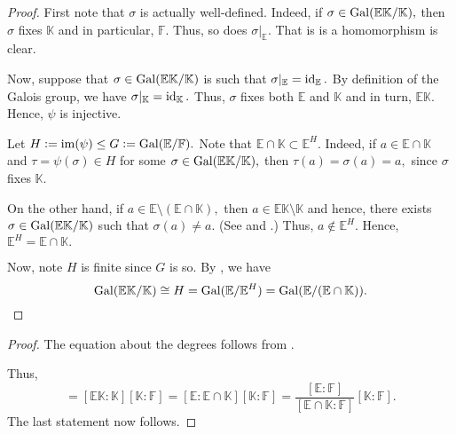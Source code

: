 \secondiso*\label{prop:secondiso2}
\begin{flushright}\hyperref[prop:secondiso]{\upsym}\end{flushright}
\begin{proof}
    First note that $\sigma$ is actually well-defined. Indeed, if $\sigma \in \operatorname{Gal}(\mathbb{E}\mathbb{K}/\mathbb{K}),$ then $\sigma$ fixes $\mathbb{K}$ and in particular, $\mathbb{F}.$ Thus, so does $\sigma|_{\mathbb{E}}.$ That is is a homomorphism is clear.

    Now, suppose that $\sigma \in \operatorname{Gal}(\mathbb{E}\mathbb{K}/\mathbb{K})$ is such that $\sigma|_{\mathbb{E}} = \operatorname{id}_{\mathbb{E}}.$ By definition of the Galois group, we have $\sigma|_{\mathbb{K}} = \operatorname{id}_{\mathbb{K}}.$ Thus, $\sigma$ fixes both $\mathbb{E}$ and $\mathbb{K}$ and in turn, $\mathbb{E}\mathbb{K}.$ Hence, $\psi$ is injective.

    Let $H \vcentcolon= \operatorname{im}(\psi) \le G \vcentcolon= \operatorname{Gal}(\mathbb{E}/\mathbb{F}).$ Note that $\mathbb{E} \cap \mathbb{K} \subset \mathbb{E}^H.$ Indeed, if $a \in \mathbb{E} \cap \mathbb{K}$ and $\tau = \psi(\sigma) \in H$ for some $\sigma \in \operatorname{Gal}(\mathbb{E}\mathbb{K}/\mathbb{K}),$ then $\tau(a) = \sigma(a) = a,$ since $\sigma$ fixes $\mathbb{K}.$

    On the other hand, if $a \in \mathbb{E} \setminus (\mathbb{E} \cap \mathbb{K}),$ then $a \in \mathbb{E}\mathbb{K} \setminus \mathbb{K}$ and hence, there exists $\sigma \in \operatorname{Gal}(\mathbb{E}\mathbb{K}/\mathbb{K})$ such that $\sigma(a) \neq a.$ (See  and .) Thus, $a \notin \mathbb{E}^H.$ Hence, $\mathbb{E}^H = \mathbb{E} \cap \mathbb{K}.$ 

    Now, note $H$ is finite since $G$ is so. By , we have 
    \begin{equation*} 
        \operatorname{Gal}(\mathbb{E}\mathbb{K}/\mathbb{K}) \cong H = \operatorname{Gal}(\mathbb{E}/\mathbb{E}^H) = \operatorname{Gal}(\mathbb{E}/(\mathbb{E} \cap \mathbb{K})). \qedhere
    \end{equation*}
\end{proof}

\secondisoindex*\label{cor:secondisoindex2}
\begin{flushright}\hyperref[cor:secondisoindex]{\upsym}\end{flushright}
\begin{proof}
    The equation about the degrees follows from .

    Thus,
    \begin{equation*} 
        [\mathbb{E}\mathbb{K} : \mathbb{F}] = [\mathbb{E}\mathbb{K} : \mathbb{K}][\mathbb{K} : \mathbb{F}] = [\mathbb{E} : \mathbb{E} \cap \mathbb{K}][\mathbb{K} : \mathbb{F}] = \frac{[\mathbb{E} : \mathbb{F}]}{[\mathbb{E} \cap \mathbb{K} : \mathbb{F}]}[\mathbb{K} : \mathbb{F}].
    \end{equation*}
    The last statement now follows.
\end{proof}


